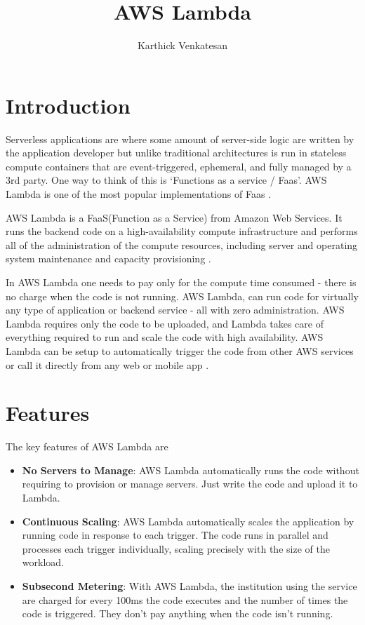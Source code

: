 \documentclass[9pt,twocolumn,twoside]{styles/osajnl}
\title{AWS Lambda}
\author[1,*,+]{Karthick Venkatesan}
\affil[1]{School of Informatics and Computing, Bloomington, IN 47408, U.S.A.}
\affil[*]{Corresponding authors: vkarthickprabu@gmail.com}
\affil[+]{HID - S17-IO-3023}
\begin{document}
\maketitle

\section{Introduction}

Serverless applications are where some amount of server-side logic are written by the application developer but unlike traditional architectures is run in stateless compute containers that are event-triggered, ephemeral, and fully managed by a 3rd party. One way to think of this is ‘Functions as a service / Faas'. AWS Lambda is one of the most popular implementations of Faas \cite{www-Serverless}.


AWS Lambda is a FaaS(Function as a Service)  from Amazon Web Services. It runs the backend code on a high-availability compute infrastructure and performs all of the administration of the compute resources, including server and operating system maintenance and capacity provisioning \cite{www-CouchAWSLambda}.
 
In AWS Lambda one needs to pay only for the compute time consumed - there is no charge when the code is not running. AWS Lambda, can run code for virtually any type of application or backend service - all with zero administration. AWS Lambda requires only the code to be uploaded, and Lambda takes care of everything required to run and scale the code with high availability. AWS Lambda can be setup to automatically trigger the code from other AWS services or call it directly from any web or mobile app \cite{www-AWSLambda}.



\section{Features}

The key features of AWS Lambda are \cite{www-AWSLambda}
\begin{itemize}
\renewcommand{\labelitemi}{\scriptsize$\bullet$} 
\item \textbf{No Servers to Manage}: AWS Lambda automatically runs the code without requiring to provision or manage servers. Just write the code and upload it to Lambda.

\item \textbf{Continuous Scaling}: AWS Lambda automatically scales the application by running code in response to each trigger. The code runs in parallel and processes each trigger individually, scaling precisely with the size of the workload.

\item \textbf{Subsecond Metering}: With AWS Lambda, the institution using the service are charged for every 100ms the code executes and the number of times the code is triggered. They don't pay anything when the code isn't running.

\end{itemize}
\end{document}
